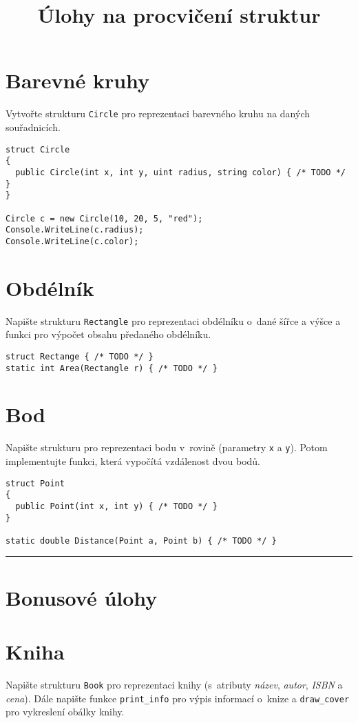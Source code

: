 \documentclass[12pt,a4paper]{article}
\begin{document}
\pagestyle{empty}
\title{Úlohy na procvičení struktur}
\date{\vspace{-12ex}}
\setlength{\droptitle}{-6em}
\maketitle

\section{Barevné kruhy}

Vytvořte strukturu \texttt{Circle} pro reprezentaci barevného kruhu na daných
souřadnicích.

\begin{verbatim}
struct Circle
{
  public Circle(int x, int y, uint radius, string color) { /* TODO */ }
}

Circle c = new Circle(10, 20, 5, "red");
Console.WriteLine(c.radius);
Console.WriteLine(c.color);
\end{verbatim}


\section{Obdélník}

Napište strukturu \texttt{Rectangle} pro reprezentaci obdélníku o dané šířce a
výšce a funkci pro výpočet obsahu předaného obdélníku.

\begin{verbatim}
struct Rectange { /* TODO */ }
static int Area(Rectangle r) { /* TODO */ }
\end{verbatim}


\section{Bod}

Napište strukturu pro reprezentaci bodu v rovině (parametry \texttt{x} a
\texttt{y}). Potom implementujte funkci, která vypočítá vzdálenost dvou bodů.

\begin{verbatim}
struct Point
{
  public Point(int x, int y) { /* TODO */ }
}

static double Distance(Point a, Point b) { /* TODO */ }
\end{verbatim}


\noindent\rule{\textwidth}{1pt}
\section*{Bonusové úlohy}

\section{Kniha}

Napište strukturu \texttt{Book} pro reprezentaci knihy (s atributy
\textit{název}, \textit{autor}, \textit{ISBN} a \textit{cena}).  Dále napište
funkce \texttt{print\_info} pro výpis informací o knize a \texttt{draw\_cover}
pro vykreslení obálky knihy.
\end{document}

